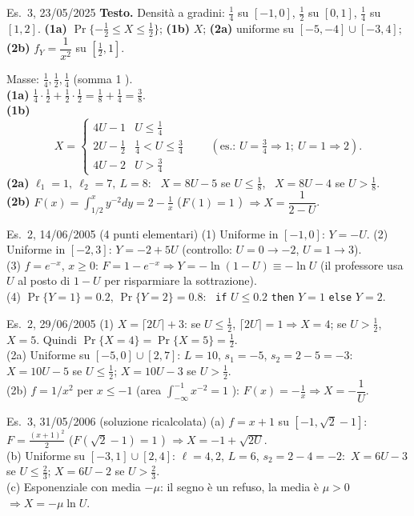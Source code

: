 \begin{esempio}{Es.~3, 23/05/2025}
\textbf{Testo.} Densità a gradini: $\tfrac14$ su $[-1,0]$, $\tfrac12$ su $[0,1]$, $\tfrac14$ su $[1,2]$. \textbf{(1a)} $\Pr\{-\tfrac12\le X\le\tfrac12\}$; \textbf{(1b)} $X$; \textbf{(2a)} uniforme su $[-5,-4]\cup[-3,4]$; \textbf{(2b)} $f_Y=\dfrac1{x^2}$ su $[\tfrac12,1]$.

Masse: $\tfrac14,\tfrac12,\tfrac14$ (somma 1 \checkmark).\\
\textbf{(1a)} $\tfrac14\cdot\tfrac12+\tfrac12\cdot\tfrac12=\tfrac18+\tfrac14=\tfrac38$.\\
\textbf{(1b)}
\[
X=\begin{cases}4U-1&U\le\tfrac14\\ 2U-\tfrac12&\tfrac14<U\le\tfrac34\\ 4U-2&U>\tfrac34\end{cases}
\qquad(\text{es.: }U=\tfrac34\Rightarrow 1;\ U=1\Rightarrow2).
\]
\textbf{(2a)} $\ell_1=1,\ \ell_2=7,\ L=8$: \ $X=8U-5$ se $U\le\tfrac18$, \ $X=8U-4$ se $U>\tfrac18$.\\
\textbf{(2b)} $F(x)=\int_{1/2}^x\!y^{-2}dy=2-\tfrac1x$ ($F(1)=1$ \checkmark) $\Rightarrow X=\dfrac1{2-U}$.
\end{esempio}

\begin{esempio}{Es.~2, 14/06/2005 (4 punti elementari)}
(1) Uniforme in $[-1,0]$: $Y=-U$. \quad (2) Uniforme in $[-2,3]$: $Y=-2+5U$ (controllo: $U=0\to-2$, $U=1\to3$).\\
(3) $f=e^{-x}$, $x\ge0$: $F=1-e^{-x}\Rightarrow Y=-\ln(1-U)\equiv-\ln U$ (il professore usa $U$ al posto di $1-U$ per risparmiare la sottrazione).\\
(4) $\Pr\{Y=1\}=0.2$, $\Pr\{Y=2\}=0.8$: \ \texttt{if} $U\le0.2$ \texttt{then} $Y=1$ \texttt{else} $Y=2$.
\end{esempio}

\begin{esempio}{Es.~2, 29/06/2005}
(1) $X=\lceil2U\rceil+3$: se $U\le\tfrac12$, $\lceil2U\rceil=1\Rightarrow X=4$; se $U>\tfrac12$, $X=5$. Quindi $\Pr\{X=4\}=\Pr\{X=5\}=\tfrac12$.\\
(2a) Uniforme su $[-5,0]\cup[2,7]$: $L=10$, $s_1=-5$, $s_2=2-5=-3$:\ $X=10U-5$ se $U\le\tfrac12$; $X=10U-3$ se $U>\tfrac12$.\\
(2b) $f=1/x^2$ per $x\le-1$ (area $\int_{-\infty}^{-1}x^{-2}=1$ \checkmark): $F(x)=-\tfrac1x\Rightarrow X=-\dfrac1U$.
\end{esempio}

\begin{esempio}{Es.~3, 31/05/2006 (soluzione ricalcolata\mio)}
(a) $f=x+1$ su $[-1,\sqrt2-1]$: $F=\tfrac{(x+1)^2}{2}$ ($F(\sqrt2-1)=1$ \checkmark) $\Rightarrow X=-1+\sqrt{2U}$.\\
(b) Uniforme su $[-3,1]\cup[2,4]$: $\ell=4,2$, $L=6$, $s_2=2-4=-2$:\ $X=6U-3$ se $U\le\tfrac23$; $X=6U-2$ se $U>\tfrac23$.\\
(c) Esponenziale \guillemotleft{}con media $-\mu$\guillemotright{}: il segno è un refuso, la media è $\mu>0$ $\Rightarrow X=-\mu\ln U$.
\end{esempio}


